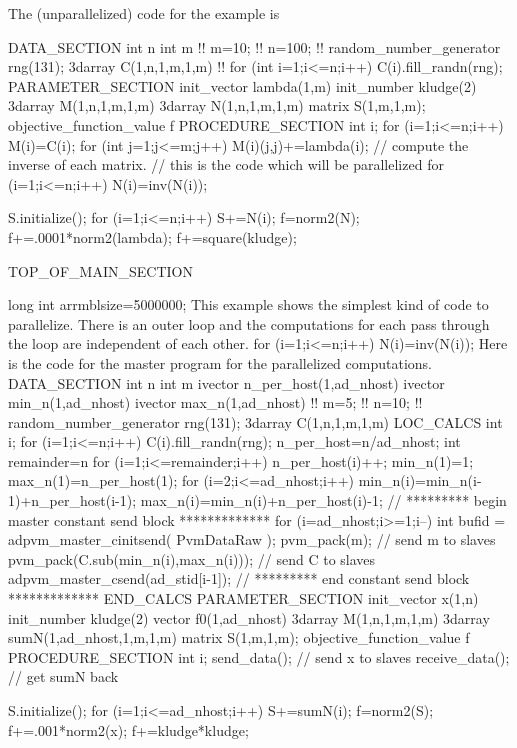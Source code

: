 The (unparallelized) code for the example is
\beginexample

DATA_SECTION
  int n
  int m
 !! m=10;
 !! n=100;
 !! random_number_generator rng(131);
  3darray C(1,n,1,m,1,m)
 !! for (int i=1;i<=n;i++) C(i).fill_randn(rng);
PARAMETER_SECTION
  init_vector lambda(1,m)
  init_number kludge(2)
  3darray M(1,n,1,m,1,m)
  3darray N(1,n,1,m,1,m)
  matrix S(1,m,1,m);
  objective_function_value f
PROCEDURE_SECTION
   int i;
   for (i=1;i<=n;i++)
   {
     M(i)=C(i);
     for (int j=1;j<=m;j++)
     {
       M(i)(j,j)+=lambda(i);
     }
   }
   // compute the inverse of each matrix. 
   // this is the code which will be parallelized
   for (i=1;i<=n;i++)
   {
     N(i)=inv(N(i));
   }

   S.initialize();
   for (i=1;i<=n;i++)
   {
     S+=N(i);
   }
   f=norm2(N);
   f+=.0001*norm2(lambda);
   f+=square(kludge);
  
TOP_OF_MAIN_SECTION
  
  long int arrmblsize=5000000;
\endexample
This example shows the simplest kind of code to parallelize.
There is an outer loop and the computations for each pass
through the loop are independent of each other.
\beginexample
   for (i=1;i<=n;i++)
   {
     N(i)=inv(N(i));
   }
\endexample
Here is the code for the master program for the parallelized computations.
\beginexample
DATA_SECTION
  int n
  int m
  ivector n_per_host(1,ad_nhost)
  ivector min_n(1,ad_nhost)
  ivector max_n(1,ad_nhost)
 !! m=5;
 !! n=10;
 !! random_number_generator rng(131);
  3darray C(1,n,1,m,1,m)
 LOC_CALCS
  int i;
  for (i=1;i<=n;i++) C(i).fill_randn(rng);
  n_per_host=n/ad_nhost;
  int remainder=n%
  for (i=1;i<=remainder;i++) n_per_host(i)++;
  min_n(1)=1;
  max_n(1)=n_per_host(1);
  for (i=2;i<=ad_nhost;i++) 
  {
    min_n(i)=min_n(i-1)+n_per_host(i-1);
    max_n(i)=min_n(i)+n_per_host(i)-1;
  }
  // *********  begin master constant send block  *************
  for (i=ad_nhost;i>=1;i--) 
  {
    int bufid = adpvm_master_cinitsend( PvmDataRaw );
    pvm_pack(m); // send m to slaves
    pvm_pack(C.sub(min_n(i),max_n(i))); // send C to slaves
    adpvm_master_csend(ad_stid[i-1]);
  }
  // *********  end constant send block  *************
 END_CALCS
PARAMETER_SECTION
  init_vector x(1,n)
  init_number kludge(2)
  vector f0(1,ad_nhost)
  3darray M(1,n,1,m,1,m)
  3darray sumN(1,ad_nhost,1,m,1,m)
  matrix S(1,m,1,m);
  objective_function_value f
PROCEDURE_SECTION
   int i;
   send_data(); // send x to slaves
   receive_data(); // get sumN back
   
   S.initialize();
   for (i=1;i<=ad_nhost;i++)
   {
     S+=sumN(i);
   }
   f=norm2(S);
   f+=.001*norm2(x);
   f+=kludge*kludge;
  
